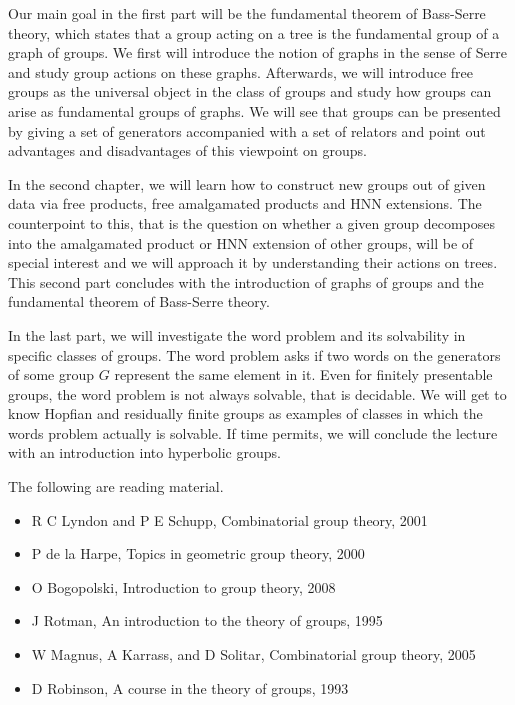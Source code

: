 Our main goal in the first part will be the fundamental theorem of Bass-Serre theory, which states that a group acting on a tree is the fundamental group of a graph of groups. We first will introduce the notion of graphs in the sense of Serre and study group actions on these graphs. Afterwards, we will introduce free groups as the universal object in the class of groups and study how groups can arise as fundamental groups of graphs. We will see that groups can be presented by giving a set of generators accompanied with a set of relators and point out advantages and disadvantages of this viewpoint on groups.

In the second chapter, we will learn how to construct new groups out of given data via free products, free amalgamated products and HNN extensions. The counterpoint to this, that is the question on whether a given group decomposes into the amalgamated product or HNN extension of other groups, will be of special interest and we will approach it by understanding their actions on trees. This second part concludes with the introduction of graphs of groups and the fundamental theorem of Bass-Serre theory.

In the last part, we will investigate the word problem and its solvability in specific classes of groups. The word problem asks if two words on the generators of some group $ G $ represent the same element in it. Even for finitely presentable groups, the word problem is not always solvable, that is decidable. We will get to know Hopfian and residually finite groups as examples of classes in which the words problem actually is solvable. If time permits, we will conclude the lecture with an introduction into hyperbolic groups.

The following are reading material.
\begin{itemize}
\item R C Lyndon and P E Schupp, Combinatorial group theory, 2001
\item P de la Harpe, Topics in geometric group theory, 2000
\item O Bogopolski, Introduction to group theory, 2008
\item J Rotman, An introduction to the theory of groups, 1995
\item W Magnus, A Karrass, and D Solitar, Combinatorial group theory, 2005
\item D Robinson, A course in the theory of groups, 1993
\end{itemize}

\pagebreak

